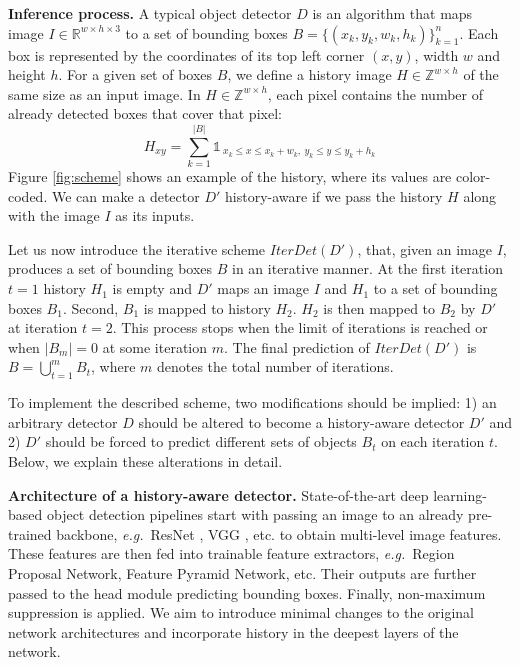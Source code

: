 \documentclass[runningheads]{llncs}
\newcommand{\eg}{\emph{e.g.}\ }
\begin{document}
\textbf{Inference process.} A typical object detector $D$ is an algorithm that maps image $I \in \mathbb{R}^{w \times h \times 3}$ to a set of bounding boxes $B=\{(x_k, y_k, w_k, h_k)\}_{k=1}^{n}$. Each box is represented by the coordinates of its top left corner $(x, y)$, width $w$ and height $h$. For a given set of boxes $B$, we define a history image $H \in \mathbb{Z}^{w \times h}$ of the same size as an input image. In $H \in \mathbb{Z}^{w \times h}$, each pixel contains the number of already detected boxes that cover that pixel:
\begin{equation}
H_{xy}=\sum_{k=1}^{|B|}{\mathds{1}_{\ x_k \le x \le x_k + w_k,\ y_k \le y \le y_k + h_k}}
\end{equation}
Figure \ref{fig:scheme} shows an example of the history, where its values are color-coded. We can make a detector $D'$ history-aware if we pass the history $H$ along with the image $I$ as its inputs.

Let us now introduce the iterative scheme $IterDet(D')$, that, given an image $I$, produces a set of bounding boxes $B$ in an iterative manner. At the first iteration $t=1$ history $H_1$ is empty and $D'$ maps an image $I$ and $H_1$ to a set of bounding boxes $B_1$. Second, $B_1$ is mapped to history $H_2$. $H_2$ is then mapped to $B_2$ by $D'$ at iteration $t=2$. This process stops when the limit of iterations is reached or when $|B_m|=0$ at some iteration $m$. The final prediction of $IterDet(D')$ is $B=\bigcup_{t=1}^{m} B_{t}$, where $m$ denotes the total number of iterations.

To implement the described scheme, two modifications should be implied: 1) an arbitrary detector $D$ should be altered to become a history-aware detector $D'$ and 2) $D'$ should be forced to predict different sets of objects $B_t$ on each iteration $t$. Below, we explain these alterations in detail.

\textbf{Architecture of a history-aware detector.} State-of-the-art deep learning-based object detection pipelines start with passing an image to an already pre-trained backbone, \eg ResNet \cite{he2015deep}, VGG \cite{simonyan2014very}, etc. to obtain multi-level image features. These features are then fed into trainable feature extractors, \eg Region Proposal Network, Feature Pyramid Network, etc. Their outputs are further passed to the head module predicting bounding boxes. Finally, non-maximum suppression is applied. We aim to introduce minimal changes to the original network architectures and incorporate history in the deepest layers of the network.
\end{document}
